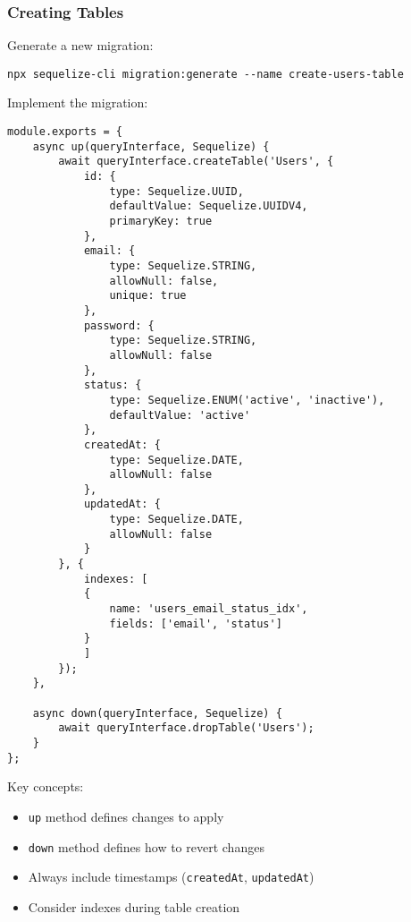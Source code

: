 \documentclass[12pt,a4paper]{book}
\begin{document}
	\subsubsection{Creating Tables}
	\begin{tcolorbox}[title=Table Creation Migration]
		Generate a new migration:
		
		\begin{verbatim}
npx sequelize-cli migration:generate --name create-users-table
		\end{verbatim}
		
		Implement the migration:
		
		\begin{verbatim}
module.exports = {
	async up(queryInterface, Sequelize) {
		await queryInterface.createTable('Users', {
			id: {
				type: Sequelize.UUID,
				defaultValue: Sequelize.UUIDV4,
				primaryKey: true
			},
			email: {
				type: Sequelize.STRING,
				allowNull: false,
				unique: true
			},
			password: {
				type: Sequelize.STRING,
				allowNull: false
			},
			status: {
				type: Sequelize.ENUM('active', 'inactive'),
				defaultValue: 'active'
			},
			createdAt: {
				type: Sequelize.DATE,
				allowNull: false
			},
			updatedAt: {
				type: Sequelize.DATE,
				allowNull: false
			}
		}, {
			indexes: [
			{
				name: 'users_email_status_idx',
				fields: ['email', 'status']
			}
			]
		});
	},
	
	async down(queryInterface, Sequelize) {
		await queryInterface.dropTable('Users');
	}
};
		\end{verbatim}
		
		Key concepts:
		\begin{itemize}
			\item \texttt{up} method defines changes to apply
			\item \texttt{down} method defines how to revert changes
			\item Always include timestamps (\texttt{createdAt}, \texttt{updatedAt})
			\item Consider indexes during table creation
		\end{itemize}
	\end{tcolorbox}
	
\end{document}
